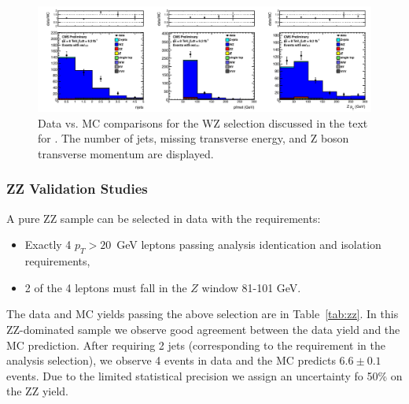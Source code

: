 \begin{figure}[tbh]
\begin{center}
\includegraphics[width=1\linewidth]{plots/WZ_eemm_92fb.pdf}
\caption{\label{fig:wz}\protect 
Data vs. MC comparisons for the WZ selection discussed in the text for \lumi. 
The number of jets, missing transverse energy, and Z boson transverse momentum are displayed.
}
\end{center}
\end{figure}

\clearpage

\subsubsection{ZZ Validation Studies}
\label{sec:bkg_zz}

A pure ZZ sample can be selected in data with the requirements:

\begin{itemize}
\item Exactly 4 $p_T>20$~GeV leptons passing analysis identication and isolation requirements,
\item 2 of the 4 leptons must fall in the $Z$ window 81-101 GeV.
\end{itemize}

The data and MC yields passing the above selection are in Table~\ref{tab:zz}. 
In this ZZ-dominated sample we observe good agreement between the data yield and the MC prediction.
After requiring 2 jets (corresponding to the requirement in the analysis selection), we observe 4 events
in data and the MC predicts $6.6\pm0.1$ events. Due to the limited statistical precision we assign an uncertainty
fo 50\% on the ZZ yield.

